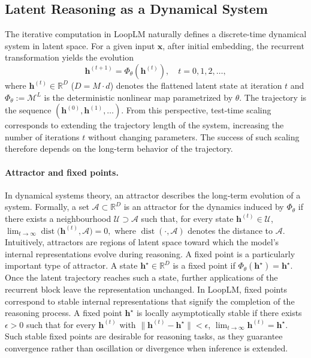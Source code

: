 \subsection{Latent Reasoning as a Dynamical System}
The iterative computation in LoopLM naturally defines a discrete-time dynamical system in latent space. For a given input \(\mathbf{x}\), after initial embedding, the recurrent transformation yields the evolution
\begin{equation}
\mathbf{h}^{(t+1)} = \Phi_\theta(\mathbf{h}^{(t)}), \quad t = 0,1,2,\dots,
\end{equation}
where \(\mathbf{h}^{(t)} \in \mathbb{R}^D\) (\(D = M \cdot d\)) denotes the flattened latent state at iteration \(t\) and \(\Phi_\theta := \mathcal{M}^L\) is the deterministic nonlinear map parametrized by \(\theta\). The trajectory is the sequence $(\mathbf{h}^{(0)},\mathbf{h}^{(1)},\dots)$.
From this perspective, test-time scaling corresponds to extending the trajectory length of the system, increasing the number of iterations \(t\) without changing parameters. The success of such scaling therefore depends on the long-term behavior of the trajectory.


\paragraph{Attractor and fixed points.} In dynamical systems theory, an attractor describes the long‑term evolution of a system. Formally, a set \(\mathcal{A} \subset \mathbb{R}^D\) is an attractor for the dynamics induced by \(\Phi_\theta\) if there exists a neighbourhood \(\mathcal{U} \supset \mathcal{A}\) such that, for every state \(\mathbf{h}^{(t)} \in \mathcal{U}\),
$
\lim_{t \to \infty} \operatorname{dist}\bigl(\mathbf{h}^{(t)},\mathcal{A}\bigr)=0,
$
where \(\operatorname{dist}(\cdot,\mathcal{A})\) denotes the distance to \(\mathcal{A}\). Intuitively, attractors are regions of latent space toward which the model’s internal representations evolve during reasoning.
A fixed point is a particularly important type of attractor. A state \(\mathbf{h}^\star \in \mathbb{R}^D\) is a fixed point if
$
\Phi_\theta(\mathbf{h}^\star)=\mathbf{h}^\star.
$
Once the latent trajectory reaches such a state, further applications of the recurrent block leave the representation unchanged. In LoopLM, fixed points correspond to stable internal representations that signify the completion of the reasoning process.
A fixed point \(\mathbf{h}^\star\) is locally asymptotically stable if there exists \(\epsilon>0\) such that for every \(\mathbf{h}^{(t)}\) with \(\|\mathbf{h}^{(t)}-\mathbf{h}^\star\|<\epsilon\),
$
\lim_{t \to \infty} \mathbf{h}^{(t)}=\mathbf{h}^\star.
$
Such stable fixed points are desirable for reasoning tasks, as they guarantee convergence rather than oscillation or divergence when inference is extended.


